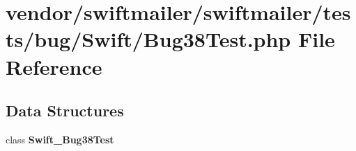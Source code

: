 \section{vendor/swiftmailer/swiftmailer/tests/bug/\+Swift/\+Bug38\+Test.php File Reference}
\label{_bug38_test_8php}
\subsection*{Data Structures}
\begin{DoxyCompactItemize}
\item 
class {\bf Swift\+\_\+\+Bug38\+Test}
\end{DoxyCompactItemize}
